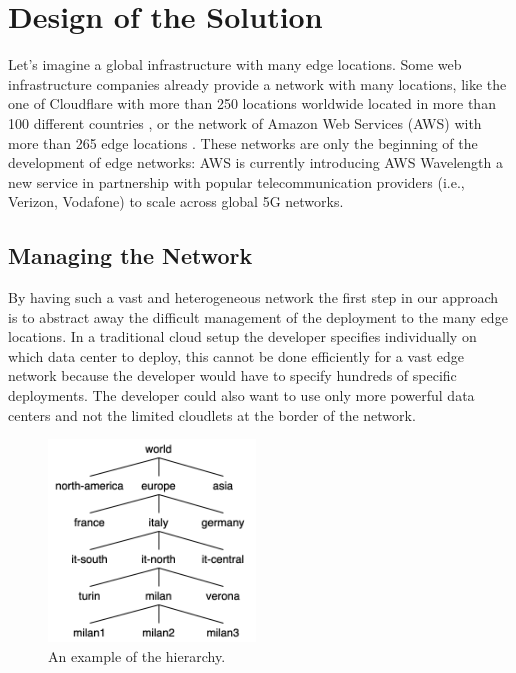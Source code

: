 \chapter{Design of the Solution}
\label{ch:design-of-the-solution}

Let’s imagine a global infrastructure with many edge locations. Some web infrastructure companies already provide a network with many locations, like the one of Cloudflare with more than 250 locations worldwide located in more than 100 different countries \cite{cloudflare-network}, or the network of Amazon Web Services (AWS) with more than 265 edge locations \cite{aws-network}.
These networks are only the beginning of the development of edge networks: AWS is currently introducing AWS Wavelength \cite{aws-wavelength} a new service in partnership with popular telecommunication providers (i.e., Verizon, Vodafone) to scale across global 5G networks.


\section{Managing the Network}
By having such a vast and heterogeneous network the first step in our approach is to abstract away the difficult management of the deployment to the many edge locations.
In a traditional cloud setup the developer specifies individually on which data center to deploy, this cannot be done efficiently for a vast edge network because the developer would have to specify hundreds of specific deployments.
The developer could also want to use only more powerful data centers and not the limited cloudlets at the border of the network.

\begin{figure} %
\caption{An example of the hierarchy.}
\label{fig:hierarchy}
\includegraphics[width=5.5cm]{Figures/Solution/hierarchy.png}
\end{figure} 

